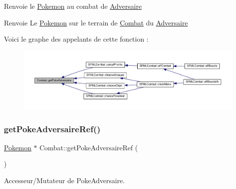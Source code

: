 Renvoie le \hyperlink{class_pokemon}{Pokemon} au combat de \hyperlink{class_adversaire}{Adversaire} \begin{DoxyReturn}{Renvoie}
Le \hyperlink{class_pokemon}{Pokemon} sur le terrain de \hyperlink{class_combat}{Combat} du \hyperlink{class_adversaire}{Adversaire} 
\end{DoxyReturn}
Voici le graphe des appelants de cette fonction \+:\nopagebreak
\begin{figure}[H]
\begin{center}
\leavevmode
\includegraphics[width=350pt]{class_combat_aa06e658e7fb4ab91174ba4d832588bae_icgraph}
\end{center}
\end{figure}
\mbox{\label{class_combat_a4f02e335d825eb98b64d5410a590b9f8}} 
\subsubsection{\texorpdfstring{get\+Poke\+Adversaire\+Ref()}{getPokeAdversaireRef()}}
{\footnotesize\ttfamily \hyperlink{class_pokemon}{Pokemon} $\ast$ Combat\+::get\+Poke\+Adversaire\+Ref (\begin{DoxyParamCaption}{ }\end{DoxyParamCaption})}



Accesseur/\+Mutateur de Poke\+Adversaire. 

